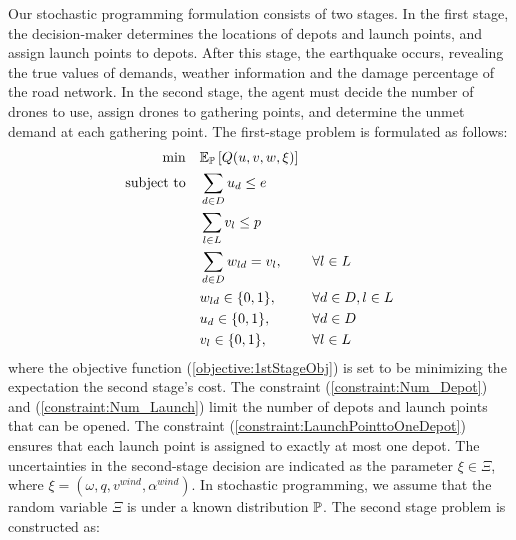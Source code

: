 \documentclass[preprint,review,11pt,authoryear]{elsarticle}
\begin{document}
Our stochastic programming formulation consists of two stages. In the first stage, the decision-maker determines the locations of depots and launch points, and assign launch points to depots. After this stage, the earthquake occurs, revealing the true values of demands, weather information and the damage percentage of the road network. In the second stage, the agent must decide the number of drones to use, assign drones to gathering points, and determine the unmet demand at each gathering point. The first-stage problem is formulated as follows:
\footnotesize
\begin{subequations} \label{formulation:1stStage}
    \begin{align}
        \min \quad & \E_{\P} \left[ Q(u,v,w,\xi) \right] && \label{objective:1stStageObj} \\
        \subjectto \quad & \sum_{d \in D} u_d \leq e     && \label{constraint:Num_Depot} \\
                         & \sum_{l \in L} v_l \leq p     && \label{constraint:Num_Launch} \\
                         & \sum_{d \in D} w_{ld} = v_l,  && \forall l \in L \label{constraint:LaunchPointtoOneDepot} \\
                         & w_{ld} \in \{0,1\}, && \forall d \in D, l \in L \label{constraint:wBinary} \\
                         & u_d \in \{0,1\}, && \forall d \in D \label{constraint:uBinary} \\
                         & v_l \in \{0,1\}, && \forall l \in L \label{constraint:vBinary}
    \end{align}
\end{subequations}
\normalsize
where the objective function (\ref{objective:1stStageObj}) is set to be minimizing the expectation the second stage's cost. The constraint (\ref{constraint:Num_Depot}) and (\ref{constraint:Num_Launch}) limit the number of depots and launch points that can be opened. The constraint (\ref{constraint:LaunchPointtoOneDepot}) ensures that each launch point is assigned to exactly at most one depot. The uncertainties in the second-stage decision are indicated as the parameter $\xi \in \Xi$, where $\xi = \left( \omega, q , v^{wind} , \alpha^{wind} \right)$. In stochastic programming, we assume that the random variable $\Xi$ is under a known distribution $\P$. The second stage problem is constructed as:
\footnotesize
\allowdisplaybreaks
\end{document}
